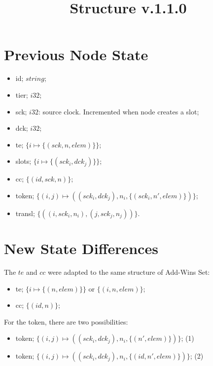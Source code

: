 \documentclass{article}
\title{Structure v.1.1.0}
\begin{document}
\maketitle

\section{Previous Node State}

\begin{itemize}
    \item \textsf{id}; $string$;
    \item \textsf{tier}; $i32$;
    \item \textsf{sck}; $i32$: source clock. Incremented when node creates a slot; 
    \item \textsf{dck}; $i32$;
    \item \textsf{te}; $\{i \mapsto \{(sck, n, elem)\}\}$;
    \item \textsf{slots}; $\{i \mapsto \{(sck_i, dck_j)\}\}$;
    \item \textsf{cc}; $\{(id, sck, n)\}$;
    \item \textsf{token}; $\{(i,j) \mapsto ((sck_i, dck_j), n_i, \{(sck_i, n', elem)\})\}$;
    \item \textsf{transl}; $\{((i, sck_i, n_i), (j, sck_j, n_j))\}$.
  \end{itemize}

\section{New State Differences}
The $te$ and $cc$ were adapted to the same structure of Add-Wins Set: 
\begin{itemize}
    \item \textsf{te}; $\{i \mapsto \{(n, elem)\}\}$ or $\{(i,n,elem)\}$;
    \item \textsf{cc}; $\{(id, n)\}$;
\end{itemize}
For the token, there are two possibilities: 
\begin{itemize}
    \item \textsf{token}; $\{(i,j) \mapsto ((sck_i, dck_j), n_i, \{(n', elem)\})\}$; (1)
    \item \textsf{token}; $\{(i,j) \mapsto ((sck_i, dck_j), n_i, \{(id, n', elem)\})\}$; (2)
\end{itemize} 
\end{document}
